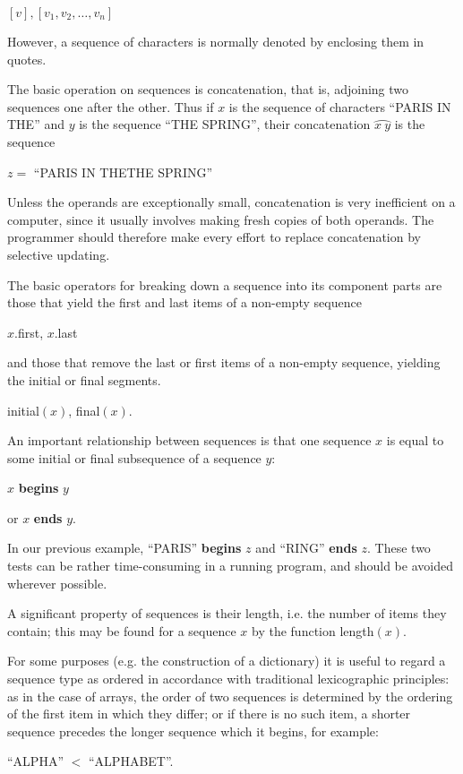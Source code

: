 \quad $[v],$\qquad $[v_1, v_2, \dots, v_n]$

\noindent
However, a sequence of characters is normally denoted by enclosing them in quotes.

The basic operation on sequences is concatenation, that is, adjoining two sequences one after the other. Thus if $x$ is the sequence of characters ``PARIS IN THE'' and $y$ is the sequence ``THE SPRING'', their concatenation $\wideparen{x\ y}$ is the sequence

\quad $z =$ ``PARIS IN THETHE SPRING''

\noindent
Unless the operands are exceptionally small, concatenation is very inefficient on a computer, since it usually involves making fresh copies of both operands. The programmer should therefore make every effort to replace concatenation by selective updating.

The basic operators for breaking down a sequence into its component parts are those that yield the first and last items of a non-empty sequence

\quad $x$.first, $x$.last

\noindent
and those that remove the last or first items of a non-empty sequence, yielding the initial or final segments.

\quad initial$(x)$, final$(x)$.

An important relationship between sequences is that one sequence $x$ is equal to some initial or final subsequence of a sequence $y$:

\quad $x$ \textbf{begins} $y$

\quad or $x$ \textbf{ends} $y$.

\noindent
In our previous example, ``PARIS'' \textbf{begins} $z$ and ``RING'' \textbf{ends} $z$. These two tests can be rather time-consuming in a running program, and should be avoided wherever possible.

A significant property of sequences is their length, i.e. the number of items they contain; this may be found for a sequence $x$ by the function length$(x)$.

For some purposes (e.g. the construction of a dictionary) it is useful to regard a sequence type as ordered in accordance with traditional lexicographic principles: as in the case of arrays, the order of two sequences is determined by the ordering of the first item in which they differ; or if there is no such item, a shorter sequence precedes the longer sequence which it begins, for example:

\quad ``ALPHA'' $<$ ``ALPHABET''.

